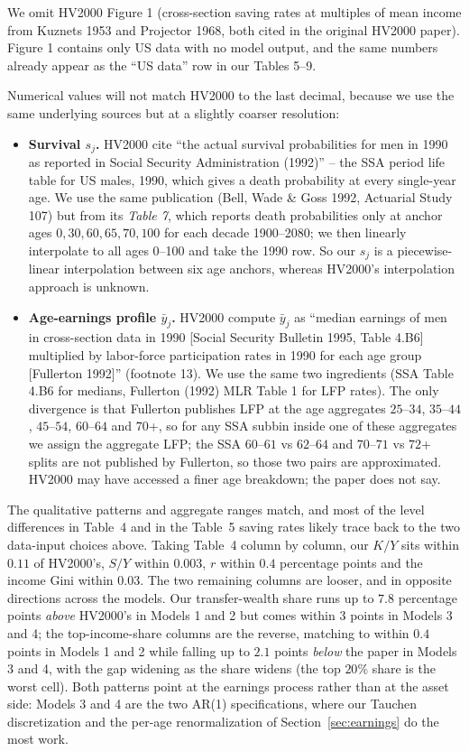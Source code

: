 \documentclass[11pt,fleqn]{article}
\begin{document}
We omit HV2000 Figure 1 (cross-section saving rates at multiples of mean income from Kuznets 1953 and Projector 1968, both cited in the original HV2000 paper). Figure 1 contains only US data with no model output, and the same numbers already appear as the ``US data'' row in our Tables 5--9.

Numerical values will not match HV2000 to the last decimal, because we use the same underlying sources but at a slightly coarser resolution:

\begin{itemize}
\item \textbf{Survival $s_j$.} HV2000 cite ``the actual survival probabilities for men in 1990 as reported in Social Security Administration (1992)'' -- the SSA period life table for US males, 1990, which gives a death probability at every single-year age. We use the same publication (Bell, Wade \& Goss 1992, Actuarial Study 107) but from its \emph{Table 7}, which reports death probabilities only at anchor ages $0, 30, 60, 65, 70, 100$ for each decade 1900--2080; we then linearly interpolate to all ages 0--100 and take the 1990 row. So our $s_j$ is a piecewise-linear interpolation between six age anchors, whereas HV2000's interpolation approach is unknown.

\item \textbf{Age-earnings profile $\bar y_j$.} HV2000 compute $\bar y_j$ as ``median earnings of men in cross-section data in 1990 [Social Security Bulletin 1995, Table 4.B6] multiplied by labor-force participation rates in 1990 for each age group [Fullerton 1992]'' (footnote 13). We use the same two ingredients (SSA Table 4.B6 for medians, Fullerton (1992) MLR Table 1 for LFP rates). The only divergence is that Fullerton publishes LFP at the age aggregates $25$--$34$, $35$--$44$, $45$--$54$, $60$--$64$ and $70$+, so for any SSA subbin inside one of these aggregates we assign the aggregate LFP; the SSA $60$--$61$ vs $62$--$64$ and $70$--$71$ vs $72$+ splits are not published by Fullerton, so those two pairs are approximated. HV2000 may have accessed a finer age breakdown; the paper does not say.
\end{itemize}

The qualitative patterns and aggregate ranges match, and most of the level differences in Table~4 and in the Table~5 saving rates likely trace back to the two data-input choices above. Taking Table~4 column by column, our $K/Y$ sits within $0.11$ of HV2000's, $S/Y$ within $0.003$, $r$ within $0.4$ percentage points and the income Gini within $0.03$. The two remaining columns are looser, and in opposite directions across the models. Our transfer-wealth share runs up to $7.8$ percentage points \emph{above} HV2000's in Models 1 and 2 but comes within $3$ points in Models 3 and 4; the top-income-share columns are the reverse, matching to within $0.4$ points in Models 1 and 2 while falling up to $2.1$ points \emph{below} the paper in Models 3 and 4, with the gap widening as the share widens (the top $20\%$ share is the worst cell). Both patterns point at the earnings process rather than at the asset side: Models 3 and 4 are the two AR(1) specifications, where our Tauchen discretization and the per-age renormalization of Section~\ref{sec:earnings} do the most work.
\end{document}
